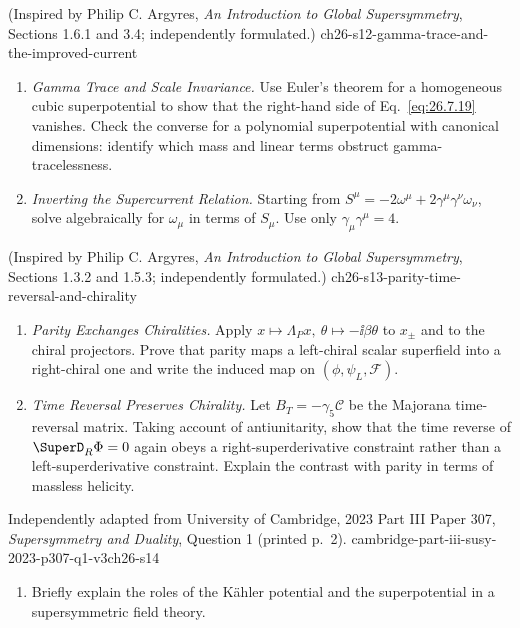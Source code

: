 \begin{enumerate}
    {(Inspired by Philip C. Argyres, \emph{An Introduction to Global Supersymmetry}, Sections 1.6.1 and 3.4; independently formulated.)}
    {ch26-s12-gamma-trace-and-the-improved-current}
  \begin{enumerate}
    \item \emph{Gamma Trace and Scale Invariance.}
    Use Euler's theorem for a homogeneous cubic superpotential to show that
      the right-hand side of Eq.~\eqref{eq:26.7.19} vanishes.  Check the
      converse for a polynomial superpotential with canonical dimensions:
      identify which mass and linear terms obstruct gamma-tracelessness.
    \item \emph{Inverting the Supercurrent Relation.}
    Starting from
      \(S^\mu=-2\omega^\mu+2\gamma^\mu\gamma^\nu\omega_\nu\),
      solve algebraically for \(\omega_\mu\) in terms of \(S_\mu\).  Use only
      \(\gamma_\mu\gamma^\mu=4\).
  \end{enumerate}

    {(Inspired by Philip C. Argyres, \emph{An Introduction to Global Supersymmetry}, Sections 1.3.2 and 1.5.3; independently formulated.)}
    {ch26-s13-parity-time-reversal-and-chirality}
  \begin{enumerate}
    \item \emph{Parity Exchanges Chiralities.}
    Apply \(x\mapsto\Lambda_Px,\ \theta\mapsto-\ii\beta\theta\) to
      \(x_\pm\) and to the chiral projectors.  Prove that parity maps a
      left-chiral scalar superfield into a right-chiral one and write the
      induced map on \((\phi,\psi_L,\mathcal F)\).
    \item \emph{Time Reversal Preserves Chirality.}
    Let \(B_T=-\gamma_5\mathcal C\) be the Majorana time-reversal matrix.
      Taking account of antiunitarity, show that the time reverse of
      \(\SuperD_R\Phi=0\) again obeys a right-superderivative constraint rather
      than a left-superderivative constraint.  Explain the contrast with
      parity in terms of massless helicity.
  \end{enumerate}

    {Independently adapted from University of Cambridge, 2023 Part III
    Paper 307, \emph{Supersymmetry and Duality}, Question 1 (printed p.~2).}
    {cambridge-part-iii-susy-2023-p307-q1-v3ch26-s14}
  \begin{enumerate}
    \item[(a)] Briefly explain the roles of the K\"ahler potential and the
    superpotential in a supersymmetric field theory.


\end{enumerate}
\end{enumerate}

